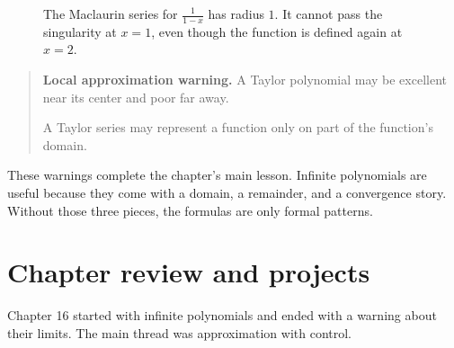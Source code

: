 \begin{figure}[h]
\centering
{}
\caption{The Maclaurin series for \(\frac1{1-x}\) has radius \(1\).  It cannot pass the singularity at \(x=1\), even though the function is defined again at \(x=2\).}
\label{fig:local-series-radius-block}
\end{figure}

\begin{quote}
\textbf{Local approximation warning.}
A Taylor polynomial may be excellent near its center and poor far away.

A Taylor series may represent a function only on part of the function's domain.
\end{quote}

These warnings complete the chapter's main lesson.  Infinite polynomials are useful
because they come with a domain, a remainder, and a convergence story.  Without those
three pieces, the formulas are only formal patterns.

\section{Chapter review and projects}
\label{sec:chapter-review-power-taylor}

Chapter 16 started with infinite polynomials and ended with a warning about their
limits.  The main thread was approximation with control.

